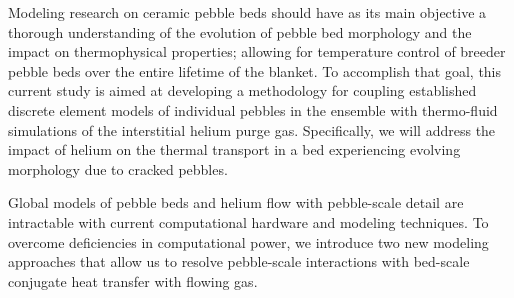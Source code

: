 Modeling research on ceramic pebble beds should have as its main objective a thorough understanding of the evolution of pebble bed morphology and the impact on thermophysical properties; allowing for temperature control of breeder pebble beds over the entire lifetime of the blanket. To accomplish that goal, this current study is aimed at developing a methodology for coupling established discrete element models of individual pebbles in the ensemble with thermo-fluid simulations of the interstitial helium purge gas. Specifically, we will address the impact of helium on the thermal transport in a bed experiencing evolving morphology due to cracked pebbles.

Global models of pebble beds and helium flow with pebble-scale detail are intractable with current computational hardware and modeling techniques. To overcome deficiencies in computational power, we introduce two new modeling approaches that allow us to resolve pebble-scale interactions with bed-scale conjugate heat transfer with flowing gas.